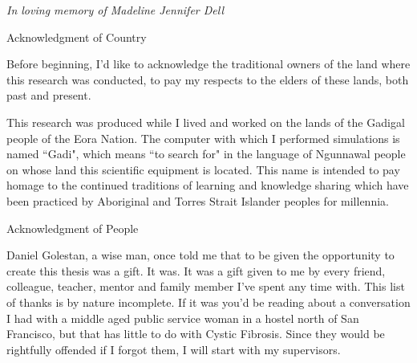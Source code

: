 \newpage


\thispagestyle{empty}


\begin{center}
	\vspace*{\fill}
\textit {In loving memory of Madeline Jennifer Dell} \\
	\vspace*{\fill}
\end{center}

\clearpage


\begin{center}
\begin{Large}
\begin{bfseries}
Acknowledgment of Country
\end{bfseries}
\end{Large}
\end{center}
Before beginning, I'd like to acknowledge the traditional owners of the land where this research was conducted, to pay my respects to the elders of these lands, both past and present. 

This research was produced while I lived and worked on the lands of the Gadigal people of the Eora Nation. The computer with which I performed simulations is named ``Gadi", which means ``to search for" in the language of Ngunnawal people on whose land this scientific equipment is located. This name is intended to pay homage to the continued traditions of learning and knowledge sharing which have been practiced by Aboriginal and Torres Strait Islander peoples for millennia. \newline

\begin{center}
\begin{Large}
\begin{bfseries}
Acknowledgment of People
\end{bfseries}
\end{Large}
\end{center}
Daniel Golestan, a wise man, once told me that to be given the opportunity to create this thesis was a gift. It was. It was a gift given to me by every friend, colleague, teacher, mentor and family member I've spent any time with. This list of thanks is by nature incomplete. If it was you'd be reading about a conversation I had with a middle aged public service woman in a hostel north of San Francisco, but that has little to do with Cystic Fibrosis. Since they would be rightfully offended if I forgot them, I will start with my supervisors.


